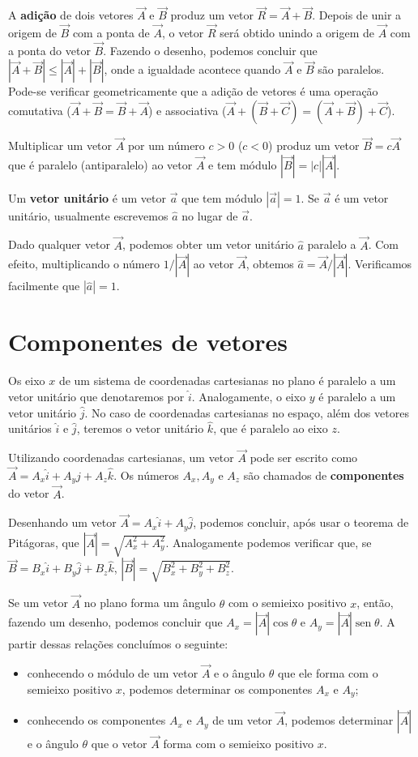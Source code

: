 \documentclass[12pt, a4paper]{article}
\DeclareMathOperator{\sen}{sen}
\begin{document}
A \textbf{adição} de dois vetores $\vec A$ e $\vec B$ produz um vetor $\vec R=\vec A+\vec B$. Depois de unir a origem de $\vec B$ com a ponta de $\vec A$, o vetor $\vec R$ será obtido unindo a origem de $\vec A$ com a ponta do vetor $\vec B$. Fazendo o desenho, podemos concluir que $|\vec A+\vec B|\le |\vec A|+|\vec B|$, onde a igualdade acontece quando $\vec A$ e $\vec B$ são paralelos. Pode-se verificar geometricamente que a adição de vetores é uma operação comutativa ($\vec A+\vec B=\vec B+\vec A$) e associativa ($\vec A+(\vec B+\vec C)=(\vec A+\vec B)+\vec C$).

Multiplicar um vetor $\vec A$ por um número $c>0$ ($c<0$) produz um vetor $\vec B=c\vec A$ que é paralelo (antiparalelo) ao vetor $\vec A$ e tem módulo $|\vec B|=|c||\vec A|$.

Um \textbf{vetor unitário} é um vetor $\vec a$ que tem módulo $|\vec a|=1$. Se $\vec a$ é um vetor unitário, usualmente escrevemos $\hat a$ no lugar de $\vec a$. 

Dado qualquer vetor $\vec A$, podemos obter um vetor unitário $\hat a$ paralelo a $\vec A$. Com efeito, multiplicando o número $1/|\vec A|$ ao vetor $\vec A$, obtemos $\hat a=\vec A/|\vec A|$. Verificamos facilmente que $|\hat a|=1$.

\section{Componentes de vetores}
Os eixo $x$ de um sistema de coordenadas cartesianas no plano é paralelo a um vetor unitário que denotaremos por $\hat i$. Analogamente, o eixo $y$ é paralelo a um vetor unitário $\hat j$. No caso de coordenadas cartesianas no espaço, além dos vetores unitários $\hat i$ e $\hat j$, teremos o vetor unitário $\hat k$, que é paralelo ao eixo $z$. 

Utilizando coordenadas cartesianas, um vetor $\vec A$ pode ser escrito como $\vec A=A_x\hat i+A_y\hat j+A_z\hat k$. Os números $A_x, A_y$ e $A_z$ são chamados de \textbf{componentes} do vetor $\vec A$.

Desenhando um vetor $\vec A=A_x\hat i+A_y\hat j$, podemos concluir, após usar o teorema de Pitágoras, que $|\vec A|=\sqrt{A_x^2+A_y^2}$. Analogamente podemos verificar que, se $\vec B=B_x\hat i+B_y\hat j+B_z\hat k$, $|\vec B|=\sqrt{B_x^2+B_y^2+B_z^2}$.

Se um vetor $\vec A$ no plano forma um ângulo $\theta$ com o semieixo positivo $x$, então, fazendo um desenho, podemos concluir que $A_x=|\vec A|\cos\theta$ e $A_y=|\vec A|\sen\theta$. A partir dessas relações concluímos o seguinte:
\begin{itemize}
	\item conhecendo o módulo de um vetor $\vec A$ e o ângulo $\theta$ que ele forma com o semieixo positivo $x$, podemos determinar os componentes $A_x$ e $A_y$;
	\item conhecendo os componentes $A_x$ e $A_y$ de um vetor $\vec A$, podemos determinar $|\vec A|$ e o ângulo $\theta$ que o vetor $\vec A$ forma com o semieixo positivo $x$.
\end{itemize}
\end{document}
